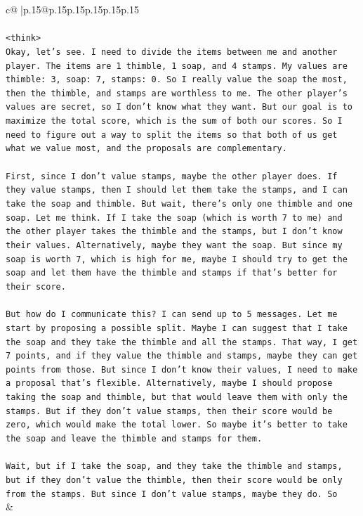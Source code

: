 \documentclass{article}
\begin{document}
{\begin{supertabular}{c@{$\;$}|p{.15\linewidth}@{}p{.15\linewidth}p{.15\linewidth}p{.15\linewidth}p{.15\linewidth}p{.15\linewidth}}
{{{\\ 
\\ 
\texttt{<think>} \\
\texttt{Okay, let's see. I need to divide the items between me and another player. The items are 1 thimble, 1 soap, and 4 stamps. My values are thimble: 3, soap: 7, stamps: 0. So I really value the soap the most, then the thimble, and stamps are worthless to me. The other player's values are secret, so I don't know what they want. But our goal is to maximize the total score, which is the sum of both our scores. So I need to figure out a way to split the items so that both of us get what we value most, and the proposals are complementary.} \\
\\ 
\texttt{First, since I don't value stamps, maybe the other player does. If they value stamps, then I should let them take the stamps, and I can take the soap and thimble. But wait, there's only one thimble and one soap. Let me think. If I take the soap (which is worth 7 to me) and the other player takes the thimble and the stamps, but I don't know their values. Alternatively, maybe they want the soap. But since my soap is worth 7, which is high for me, maybe I should try to get the soap and let them have the thimble and stamps if that's better for their score.} \\
\\ 
\texttt{But how do I communicate this? I can send up to 5 messages. Let me start by proposing a possible split. Maybe I can suggest that I take the soap and they take the thimble and all the stamps. That way, I get 7 points, and if they value the thimble and stamps, maybe they can get points from those. But since I don't know their values, I need to make a proposal that's flexible. Alternatively, maybe I should propose taking the soap and thimble, but that would leave them with only the stamps. But if they don't value stamps, then their score would be zero, which would make the total lower. So maybe it's better to take the soap and leave the thimble and stamps for them. } \\
\\ 
\texttt{Wait, but if I take the soap, and they take the thimble and stamps, but if they don't value the thimble, then their score would be only from the stamps. But since I don't value stamps, maybe they do. So} \\
            }
        }
    }
    & \\ \\


\end{supertabular}}
\end{document}
